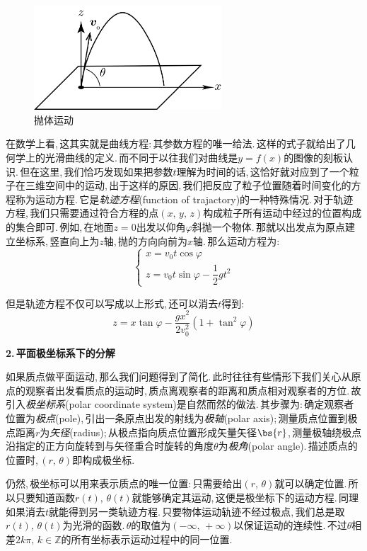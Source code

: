 \begin{figure}\label{6-1-4}
\vspace{-0.4cm}
\centering
\includegraphics[width=7cm]{image/6-1-4.png}
\caption{抛体运动}
\end{figure}
在数学上看,\,这其实就是曲线方程:\,其参数方程的唯一给法.\,这样的式子就给出了几何学上的光滑曲线的定义.\,而不同于以往我们对曲线是$y=f(x)$的图像的刻板认识.\,但在这里,\,我们恰巧发现如果把参数$t$理解为时间的话,\,这恰好就对应到了一个粒子在三维空间中的运动,\,出于这样的原因,\,我们把反应了粒子位置随着时间变化的方程称为运动方程.\,它是\emph{轨迹方程}(function of trajactory)的一种特殊情况.\,对于轨迹方程,\,我们只需要通过符合方程的点$(x,\,y,\,z)$构成粒子所有运动中经过的位置构成的集合即可.\,例如,\,在地面$z=0$出发以仰角$\varphi$斜抛一个物体.\,那就以出发点为原点建立坐标系,\,竖直向上为$z$轴,\,抛的方向向前为$x$轴.\,那么运动方程为:
\[\left\{\begin{array}{l} x=v_0 t\cos\varphi\\ z=v_0 t\sin\varphi - \dfrac{1}{2}gt^2\end{array}\right.\]

但是轨迹方程不仅可以写成以上形式,\,还可以消去$t$得到:
\[z=x\tan\varphi -\frac{gx^2}{2v_0^2}(1+\tan^2\varphi)\]

\vspace{0.2cm}
{\bf 2.\,平面极坐标系下的分解}

如果质点做平面运动,\,那么我们问题得到了简化.\,此时往往有些情形下我们关心从原点的观察者出发看质点的运动时,\,质点离观察者的距离和质点相对观察者的方位.\,故引入\emph{极坐标系}(polar coordinate system)是自然而然的做法.\,其步骤为:\,确定观察者位置为\emph{极点}(pole),\,引出一条原点出发的射线为\emph{极轴}(polar axis);\,测量质点位置到极点距离$r$为\emph{矢径}(radius);\,从极点指向质点位置形成矢量矢径$\bs{r}$,\,测量极轴绕极点沿指定的正方向旋转到与矢径重合时旋转的角度$\theta$为\emph{极角}(polar angle).\,描述质点的位置时,\,$(r,\,\theta)$即构成极坐标.

仍然,\,极坐标可以用来表示质点的唯一位置:\,只需要给出$(r,\,\theta)$就可以确定位置.\,所以只要知道函数$r(t),\,\theta(t)$就能够确定其运动,\,这便是极坐标下的运动方程.\,同理如果消去$t$就能得到另一类轨迹方程.\,只要物体运动轨迹不经过极点,\,我们总是取$r(t),\,\theta(t)$为光滑的函数.\,$\theta$的取值为$(-\infty,\,+\infty)$以保证运动的连续性.\,不过$\theta$相差$2k\pi,\,k\in\mathbb{Z}$的所有坐标表示运动过程中的同一位置.

